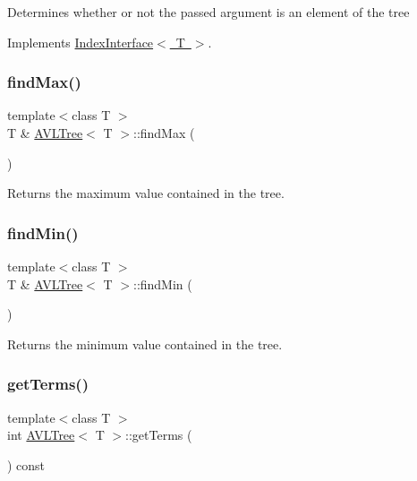 Determines whether or not the passed argument is an element of the tree 

Implements \mbox{\hyperlink{classIndexInterface}{Index\+Interface$<$ T $>$}}.

\mbox{\label{classAVLTree_a2bae23bdf0a05bdfa8c7b77ea46b5d3e}} 
\subsubsection{\texorpdfstring{find\+Max()}{findMax()}}
{\footnotesize\ttfamily template$<$class T $>$ \\
T \& \mbox{\hyperlink{classAVLTree}{A\+V\+L\+Tree}}$<$ T $>$\+::find\+Max (\begin{DoxyParamCaption}{ }\end{DoxyParamCaption})}

Returns the maximum value contained in the tree. \mbox{\label{classAVLTree_a3cb9a9b85e4955d79e706f2e589dfc70}} 
\subsubsection{\texorpdfstring{find\+Min()}{findMin()}}
{\footnotesize\ttfamily template$<$class T $>$ \\
T \& \mbox{\hyperlink{classAVLTree}{A\+V\+L\+Tree}}$<$ T $>$\+::find\+Min (\begin{DoxyParamCaption}{ }\end{DoxyParamCaption})}

Returns the minimum value contained in the tree. \mbox{\label{classAVLTree_aef337841336fe9e42e4575283139b205}} 
\subsubsection{\texorpdfstring{get\+Terms()}{getTerms()}}
{\footnotesize\ttfamily template$<$class T $>$ \\
int \mbox{\hyperlink{classAVLTree}{A\+V\+L\+Tree}}$<$ T $>$\+::get\+Terms (\begin{DoxyParamCaption}{ }\end{DoxyParamCaption}) const\hspace{0.3cm}{\ttfamily [virtual]}}

